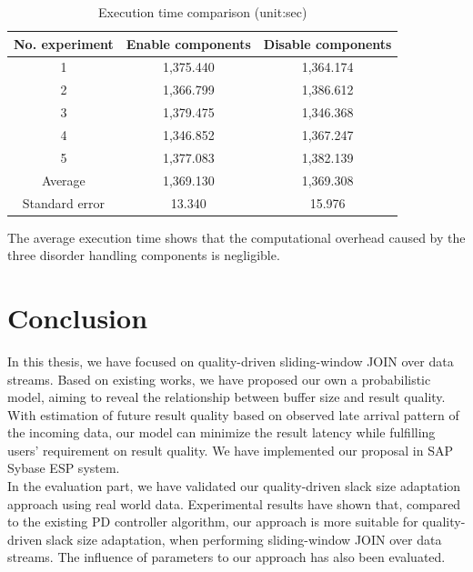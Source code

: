 \documentclass[a4paper, 11pt, twoside]{report}
\begin{document}
\begin{table}[h]
\begin{center}
\begin{tabular}{|c|c|c|}
\hline
No. experiment     & Enable components & Disable components \\ \hline
1                  & 1,375.440         & 1,364.174          \\ \hline
2                  & 1,366.799         & 1,386.612          \\ \hline
3                  & 1,379.475         & 1,346.368          \\ \hline
4                  & 1,346.852         & 1,367.247          \\ \hline
5                  & 1,377.083         & 1,382.139          \\ \hline
Average            & 1,369.130         & 1,369.308          \\ \hline
Standard error     & 13.340            & 15.976             \\ \hline
\end{tabular}
\caption{Execution time comparison (unit:sec)\label{table:overhead-comparison}}
\end{center}
\end{table}

The average execution time shows that the computational overhead caused by the three disorder handling components is negligible.\\

\cleardoublepage

\chapter{Conclusion}

In this thesis, we have focused on quality-driven sliding-window JOIN over data streams. Based on existing works, we have proposed our own a probabilistic model, aiming to reveal the relationship between buffer size and result quality. With estimation of future result quality based on observed late arrival pattern of the incoming data, our model can minimize the result latency while fulfilling users' requirement on result quality. We have implemented our proposal in SAP Sybase ESP system.\\

In the evaluation part, we have validated our quality-driven slack size adaptation approach using real world data. Experimental results have shown that, compared to the existing PD controller algorithm, our approach is more suitable for quality-driven slack size adaptation, when performing sliding-window JOIN over data streams. The influence of parameters to our approach has also been evaluated.\\
\end{document}
